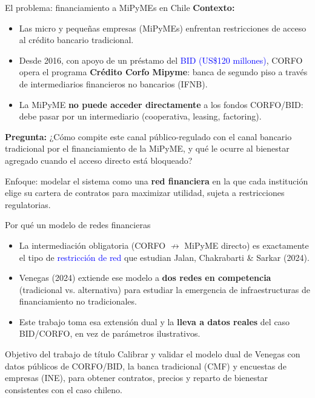 \documentclass[aspectratio=169]{beamer}
\begin{document}
\begin{frame}{El problema: financiamiento a MiPyMEs en Chile}
\textbf{Contexto:}
\begin{itemize}
    \item Las micro y pequeñas empresas (MiPyMEs) enfrentan restricciones de acceso al crédito bancario tradicional.
    \item Desde 2016, con apoyo de un préstamo del \textcolor{blue}{BID (US\$120 millones)}, CORFO opera el programa \textbf{Crédito Corfo Mipyme}: banca de segundo piso a través de intermediarios financieros no bancarios (IFNB).
    \item La MiPyME \textbf{no puede acceder directamente} a los fondos CORFO/BID: debe pasar por un intermediario (cooperativa, leasing, factoring).
\end{itemize}

\vspace{0.3cm}
\textbf{Pregunta:} ¿Cómo compite este canal público-regulado con el canal bancario tradicional por el financiamiento de la MiPyME, y qué le ocurre al bienestar agregado cuando el acceso directo está bloqueado?

\vspace{0.3cm}
\alert{Enfoque:} modelar el sistema como una \textbf{red financiera} en la que cada institución elige su cartera de contratos para maximizar utilidad, sujeta a restricciones regulatorias.
\end{frame}

\begin{frame}{Por qué un modelo de redes financieras}
\begin{itemize}
    \item La intermediación obligatoria (CORFO $\not\to$ MiPyME directo) es exactamente el tipo de \textcolor{blue}{restricción de red} que estudian Jalan, Chakrabarti \& Sarkar (2024).
    \item Venegas (2024) extiende ese modelo a \textbf{dos redes en competencia} (tradicional vs. alternativa) para estudiar la emergencia de infraestructuras de financiamiento no tradicionales.
    \item Este trabajo toma esa extensión dual y la \textbf{lleva a datos reales} del caso BID/CORFO, en vez de parámetros ilustrativos.
\end{itemize}

\vspace{0.4cm}
\begin{block}{Objetivo del trabajo de título}
Calibrar y validar el modelo dual de Venegas con datos públicos de CORFO/BID, la banca tradicional (CMF) y encuestas de empresas (INE), para obtener contratos, precios y reparto de bienestar consistentes con el caso chileno.
\end{block}
\end{frame}
\end{document}
